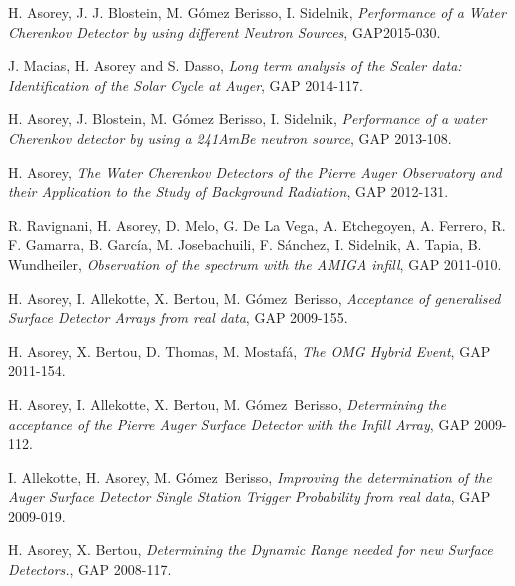 \noindent
\begin{etaremune}

\item {} H. Asorey, J. J. Blostein, M. Gómez Berisso, I. Sidelnik, {\emph{Performance of a Water Cherenkov Detector by using different Neutron Sources}}, GAP2015-030.

\item {} J. Macias, H. Asorey and S. Dasso, {\emph{Long term analysis of the Scaler data: Identification of the Solar Cycle at Auger}}, GAP 2014-117.

\item {} H. Asorey, J. Blostein, M. Gómez Berisso, I. Sidelnik, {\emph{Performance of a water Cherenkov detector by using a 241AmBe neutron source}}, GAP 2013-108.

\item {} H. Asorey, {\emph{The Water Cherenkov Detectors of the Pierre Auger Observatory and their Application to the Study of Background Radiation}}, GAP 2012-131.

\item {} R. Ravignani, H. Asorey, D. Melo, G. De La Vega, A. Etchegoyen, A. Ferrero, R. F. Gamarra, B. García, M. Josebachuili, F. Sánchez, I. Sidelnik, A. Tapia, B. Wundheiler, {\emph{Observation of the spectrum with the AMIGA infill}}, GAP 2011-010.

\item {}H. Asorey, I. Allekotte, X. Bertou, M. Gómez~Berisso, {\emph{Acceptance of generalised Surface Detector Arrays from real data}}, GAP 2009-155.

\item {}H. Asorey, X. Bertou, D. Thomas, M. Mostafá, {\emph{The OMG Hybrid Event}}, GAP 2011-154.

\item {}H. Asorey, I. Allekotte, X. Bertou, M. Gómez~Berisso, {\emph{Determining the acceptance of the Pierre Auger Surface Detector with the Infill Array}}, GAP 2009-112.

\item {}I. Allekotte, H. Asorey, M. Gómez~Berisso, {\emph{Improving the determination of the Auger Surface Detector Single Station Trigger Probability from real data}}, GAP 2009-019.

\item {}H. Asorey, X. Bertou, {\emph{Determining the Dynamic Range needed for new Surface Detectors.}}, GAP 2008-117.


\end{etaremune}
